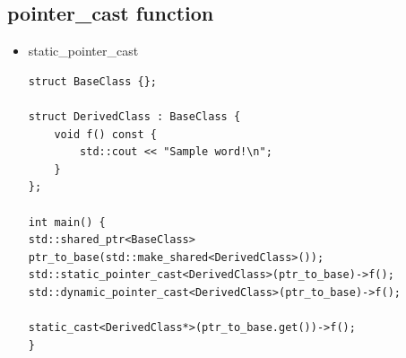 \documentclass[a4paper,12pt,twoside]{book}
\begin{document}
\subsection{pointer\_cast function}
\begin{itemize}
	\item static\_pointer\_cast
\begin{lstlisting}
struct BaseClass {};

struct DerivedClass : BaseClass {
	void f() const {
		std::cout << "Sample word!\n";
	}
};

int main() {
std::shared_ptr<BaseClass> ptr_to_base(std::make_shared<DerivedClass>());
std::static_pointer_cast<DerivedClass>(ptr_to_base)->f();
std::dynamic_pointer_cast<DerivedClass>(ptr_to_base)->f();

static_cast<DerivedClass*>(ptr_to_base.get())->f();
}
\end{lstlisting}
\end{itemize}
\end{document}
